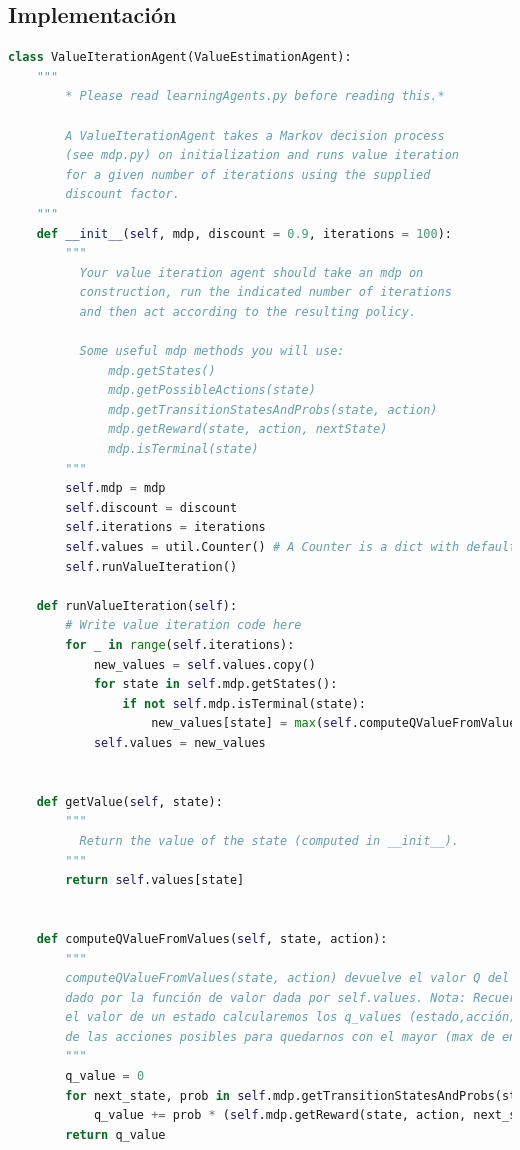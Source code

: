 \documentclass{report}
\begin{document}
      \subsection*{Implementación}
\begin{lstlisting}[language=Python, caption=Iteración de valores]
class ValueIterationAgent(ValueEstimationAgent):
    """
        * Please read learningAgents.py before reading this.*

        A ValueIterationAgent takes a Markov decision process
        (see mdp.py) on initialization and runs value iteration
        for a given number of iterations using the supplied
        discount factor.
    """
    def __init__(self, mdp, discount = 0.9, iterations = 100):
        """
          Your value iteration agent should take an mdp on
          construction, run the indicated number of iterations
          and then act according to the resulting policy.

          Some useful mdp methods you will use:
              mdp.getStates()
              mdp.getPossibleActions(state)
              mdp.getTransitionStatesAndProbs(state, action)
              mdp.getReward(state, action, nextState)
              mdp.isTerminal(state)
        """
        self.mdp = mdp
        self.discount = discount
        self.iterations = iterations
        self.values = util.Counter() # A Counter is a dict with default 0
        self.runValueIteration()

    def runValueIteration(self):
        # Write value iteration code here
        for _ in range(self.iterations):
            new_values = self.values.copy()
            for state in self.mdp.getStates():
                if not self.mdp.isTerminal(state):
                    new_values[state] = max(self.computeQValueFromValues(state, action) for action in self.mdp.getPossibleActions(state))
            self.values = new_values


    def getValue(self, state):
        """
          Return the value of the state (computed in __init__).
        """
        return self.values[state]


    def computeQValueFromValues(self, state, action):
        """
        computeQValueFromValues(state, action) devuelve el valor Q del par (estado, acción)
        dado por la función de valor dada por self.values. Nota: Recuerda que para calcular
        el valor de un estado calcularemos los q_values (estado,acción), es decir los valores
        de las acciones posibles para quedarnos con el mayor (max de entre los q_values).
        """
        q_value = 0
        for next_state, prob in self.mdp.getTransitionStatesAndProbs(state, action):
            q_value += prob * (self.mdp.getReward(state, action, next_state) + self.discount * self.values[next_state])
        return q_value
        


\end{lstlisting}
\end{document}

